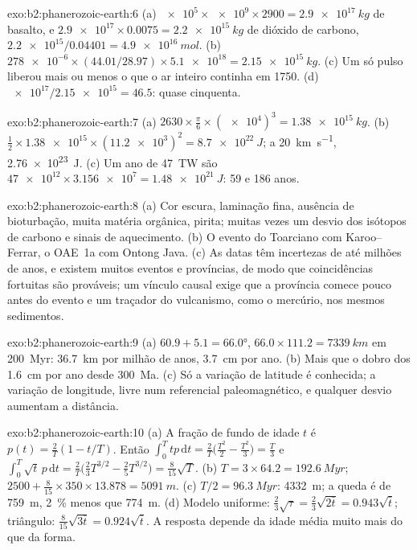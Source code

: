 \begin{solution}{exo:b2:phanerozoic-earth:6}
(a) $\num{e5} \times \num{e9} \times 2900 = \qty{2.9e17}{kg}$ de basalto, e $\num{2.9e17}
\times 0.0075 = \qty{2.2e15}{kg}$ de dióxido de carbono, $\num{2.2e15}/0.04401 = \qty{4.9e16}{mol}$.
(b) $\num{278e-6} \times (44.01/28.97) \times \num{5.1e18} = \qty{2.15e15}{kg}$. (c) Um só pulso
liberou mais ou menos o que o ar inteiro continha em 1750. (d) $\num{e17}/\num{2.15e15} = 46.5$: quase cinquenta.
\end{solution}

\begin{solution}{exo:b2:phanerozoic-earth:7}
(a) $2630 \times \frac{\pi}{6} \times (\num{e4})^3 = \qty{1.38e15}{kg}$. (b) $\tfrac12 \times
\num{1.38e15} \times (\num{11.2e3})^2 = \qty{8.7e22}{J}$; a \qty{20}{km.s^{-1}},
\qty{2.76e23}{J}. (c) Um ano de \qty{47}{TW} são $\num{47e12} \times \num{3.156e7} =
\qty{1.48e21}{J}$: 59 e 186 anos.
\end{solution}

\begin{solution}{exo:b2:phanerozoic-earth:8}
(a) Cor escura, laminação fina, ausência de bioturbação, muita matéria orgânica, pirita; muitas vezes um desvio dos
isótopos de carbono e sinais de aquecimento. (b) O evento do Toarciano com Karoo--Ferrar, o OAE~1a com
Ontong Java. (c) As datas têm incertezas de até milhões de anos, e existem muitos eventos e
províncias, de modo que coincidências fortuitas são prováveis; um vínculo causal exige que a província comece
pouco antes do evento e um traçador do vulcanismo, como o mercúrio, nos mesmos sedimentos.
\end{solution}

\begin{solution}{exo:b2:phanerozoic-earth:9}
(a) $60.9 + 5.1 = \ang{66.0}$, $66.0 \times 111.2 = \qty{7339}{km}$ em \qty{200}{Myr}:
\qty{36.7}{km} por milhão de anos, \qty{3.7}{cm} por ano. (b) Mais que o dobro dos
\qty{1.6}{cm} por ano desde \qty{300}{Ma}. (c) Só a variação de latitude é conhecida; a variação de
longitude, livre num referencial paleomagnético, e qualquer desvio aumentam a distância.
\end{solution}

\begin{solution}{exo:b2:phanerozoic-earth:10}
(a) A fração de fundo de idade $t$ é $p(t) = \frac2T(1 - t/T)$. Então $\int_0^T tp\,\mathrm{d}t =
\frac2T\bigl(\frac{T^2}2 - \frac{T^2}3\bigr) = \frac T3$ e $\int_0^T \sqrt t\,p\,\mathrm{d}t =
\frac2T\bigl(\frac23 T^{3/2} - \frac25 T^{3/2}\bigr) = \frac8{15}\sqrt T$. (b) $T = 3 \times 64.2 =
\qty{192.6}{Myr}$; $2500 + \frac8{15} \times 350 \times 13.878 = \qty{5091}{m}$. (c) $T/2 =
\qty{96.3}{Myr}$: \qty{4332}{m}; a queda é de \qty{759}{m}, \qty{2}{\percent} menos que
\qty{774}{m}. (d) Modelo uniforme: $\frac23\sqrt\tau = \frac23\sqrt{2\bar t} = 0.943\sqrt{\bar t}$;
triângulo: $\frac8{15}\sqrt{3\bar t} = 0.924\sqrt{\bar t}$. A resposta depende da idade média muito
mais do que da forma.
\end{solution}

